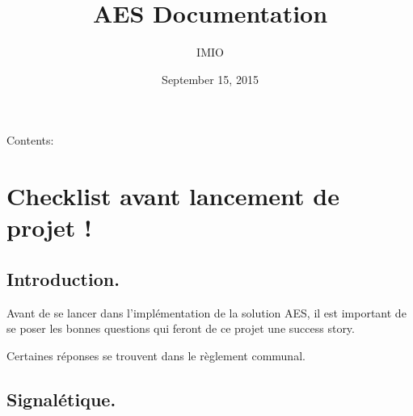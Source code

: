 \documentclass[letterpaper,10pt,english]{sphinxmanual}
\title{AES Documentation}
\date{September 15, 2015}
\author{IMIO}
\begin{document}
\maketitle
\tableofcontents
{}\label{index::doc}


Contents:


\chapter{Checklist avant lancement de projet !}
\label{checklist::doc}\label{checklist:checklist-avant-lancement-de-projet}\label{checklist:welcome-to-aes-s-documentation}

\section{Introduction.}
\label{checklist:introduction}
Avant de se lancer dans l'implémentation de la solution AES, il est important de se poser les bonnes questions qui feront de ce projet une success story.

Certaines réponses se trouvent dans le règlement communal.


\section{Signalétique.}
\label{checklist:signaletique}
\end{document}
